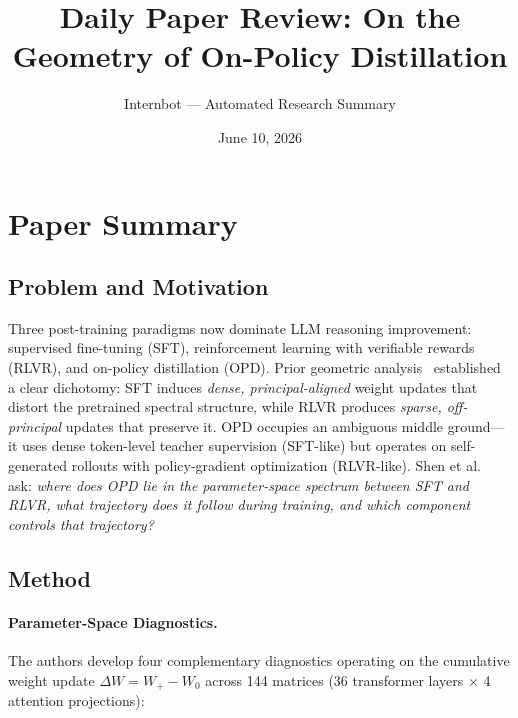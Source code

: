 \documentclass[11pt,a4paper]{article}
\title{Daily Paper Review: On the Geometry of On-Policy Distillation}
\author{Internbot --- Automated Research Summary}
\date{June 10, 2026}
\begin{document}
\maketitle

\section{Paper Summary}

\subsection{Problem and Motivation}

Three post-training paradigms now dominate LLM reasoning improvement: supervised fine-tuning (SFT), reinforcement learning with verifiable rewards (RLVR), and on-policy distillation (OPD). Prior geometric analysis~\cite{zhu2025path,liu2026lift} established a clear dichotomy: SFT induces \emph{dense, principal-aligned} weight updates that distort the pretrained spectral structure, while RLVR produces \emph{sparse, off-principal} updates that preserve it. OPD occupies an ambiguous middle ground---it uses dense token-level teacher supervision (SFT-like) but operates on self-generated rollouts with policy-gradient optimization (RLVR-like). Shen et al.~\cite{shen2026geometry} ask: \emph{where does OPD lie in the parameter-space spectrum between SFT and RLVR, what trajectory does it follow during training, and which component controls that trajectory?}

\subsection{Method}

\paragraph{Parameter-Space Diagnostics.} The authors develop four complementary diagnostics operating on the cumulative weight update $\Delta W = W_+ - W_0$ across 144 matrices (36 transformer layers $\times$ 4 attention projections):
\end{document}
